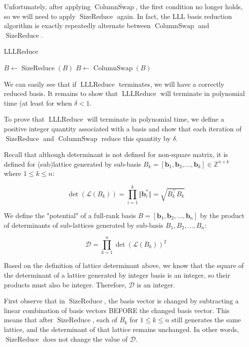 \documentclass[letterpaper,12pt]{article}
\begin{document}
Unfortunately, after applying $\operatorname{ColumnSwap}$, the first condition no longer holds, so we will need to apply $\operatorname{SizeReduce}$ again. In fact, the LLL basis reduction algorithm is exactly repeatedly alternate between $\operatorname{ColumnSwap}$ and $\operatorname{SizeReduce}$.

\begin{algorithm}
\caption{LLLReduce}
\begin{algorithmic}[1]
        \State $B \leftarrow \operatorname{SizeReduce}(B)$
        \State $B \leftarrow \operatorname{ColumnSwap}(B)$
    \EndWhile
\end{algorithmic}
\end{algorithm}

We can easily see that if $\operatorname{LLLReduce}$ terminates, we will have a correctly reduced basis. It remains to show that $\operatorname{LLLReduce}$ will terminate in polynomial time (at least for when $\delta < 1$.

To prove that $\operatorname{LLLReduce}$ will terminate in polynomial time, we define a positive integer quantity associated with a basis and show that each iteration of $\operatorname{SizeReduce}$ and $\operatorname{ColumnSwap}$ reduce this quantity by $\delta$.

Recall that although determinant is not defined for non-square matrix, it is defined for (sub)lattice generated by sub-basis $B_k = [\mathbf{b}_1, \mathbf{b}_2, \ldots, \mathbf{b}_k] \in \mathbb{Z}^{n \times k}$ where $1 \leq k \leq n$:

$$
\det(\mathcal{L}(B_k)) = \prod_{i=1}^k \Vert \mathbf{b}_i^\ast \Vert = \sqrt{B_k^\intercal B_k}
$$

We define the "potential" of a full-rank basis $B = [\mathbf{b}_1, \mathbf{b}_2, \ldots, \mathbf{b}_n]$ by the product of determinants of sub-lattices generated by sub-basis $B_1, B_2, \ldots, B_n$:

$$
\mathcal{D} = \prod_{k=1}^n \det(\mathcal{L}(B_k))^2
$$

Based on the definition of lattice determinant above, we know that the square of the determinant of a lattice generated by integer basis is an integer, so their products must also be integer. Therefore, $\mathcal{D}$ is an integer.

First observe that in $\operatorname{SizeReduce}$, the basis vector is changed by subtracting a linear combination of basis vectors BEFORE the changed basis vector. This means that after $\operatorname{SizeReduce}$, each of $B_k$ for $1\leq k \leq n$ still generates the same lattice, and the determinant of that lattice remains unchanged. In other words, $\operatorname{SizeReduce}$ does not change the value of $\mathcal{D}$.
\end{document}
